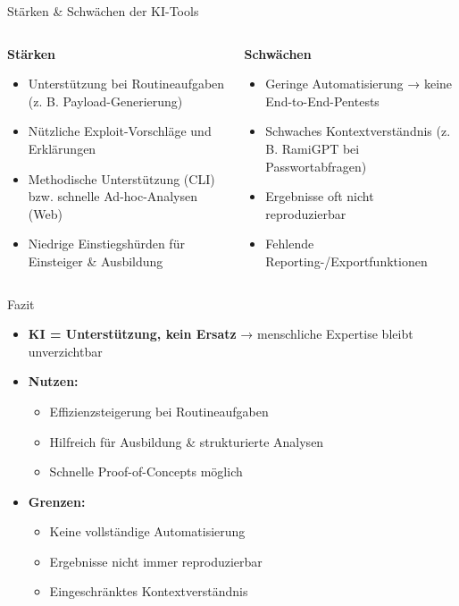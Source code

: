 \documentclass[
	aspectratio=169,	%
	onlytextwidth,		%
	t,					%
	]{beamer}
\begin{document}
\begin{frame}{Stärken \& Schwächen der KI-Tools}
	\begin{columns}[T,onlytextwidth]
		\begin{column}{0.48\textwidth}
			\textbf{Stärken}
			\begin{itemize}
				\item Unterstützung bei Routineaufgaben (z. B. Payload-Generierung)
				\item Nützliche Exploit-Vorschläge und Erklärungen
				\item Methodische Unterstützung (CLI) bzw. schnelle Ad-hoc-Analysen (Web)
				\item Niedrige Einstiegshürden für Einsteiger \& Ausbildung
			\end{itemize}
		\end{column}
		
		\begin{column}{0.48\textwidth}
			\textbf{Schwächen}
			\begin{itemize}
				\item Geringe Automatisierung → keine End-to-End-Pentests
				\item Schwaches Kontextverständnis (z. B. RamiGPT bei Passwortabfragen)
				\item Ergebnisse oft nicht reproduzierbar
				\item Fehlende Reporting-/Exportfunktionen
			\end{itemize}
		\end{column}
	\end{columns}
\end{frame}

\begin{frame}{Fazit}
	\begin{itemize}
		\item \textbf{KI = Unterstützung, kein Ersatz}  
		→ menschliche Expertise bleibt unverzichtbar
		
		\item \textbf{Nutzen:}
		\begin{itemize}
			\item Effizienzsteigerung bei Routineaufgaben
			\item Hilfreich für Ausbildung \& strukturierte Analysen
			\item Schnelle Proof-of-Concepts möglich
		\end{itemize}
		
		\item \textbf{Grenzen:}
		\begin{itemize}
			\item Keine vollständige Automatisierung
			\item Ergebnisse nicht immer reproduzierbar
			\item Eingeschränktes Kontextverständnis
		\end{itemize}
	\end{itemize}
\end{frame}
\end{document}
